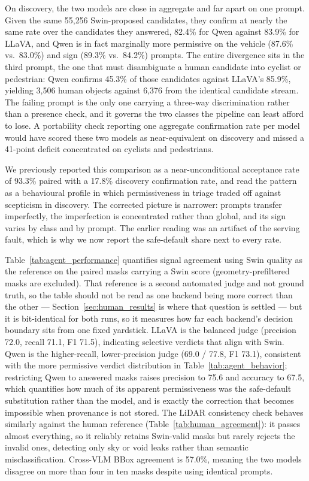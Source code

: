 \documentclass[conference]{IEEEtran}
\begin{document}
On discovery, the two models are close in aggregate and far apart on one prompt.
Given the same 55{,}256 Swin-proposed candidates, they confirm at nearly the same rate over the candidates they answered, 82.4\% for Qwen against 83.9\% for LLaVA, and Qwen is in fact marginally more permissive on the vehicle (87.6\% vs.\ 83.0\%) and sign (89.3\% vs.\ 84.2\%) prompts.
The entire divergence sits in the third prompt, the one that must disambiguate a human candidate into cyclist or pedestrian: Qwen confirms 45.3\% of those candidates against LLaVA's 85.9\%, yielding 3{,}506 human objects against 6{,}376 from the identical candidate stream.
The failing prompt is the only one carrying a three-way discrimination rather than a presence check, and it governs the two classes the pipeline can least afford to lose.
A portability check reporting one aggregate confirmation rate per model would have scored these two models as near-equivalent on discovery and missed a 41-point deficit concentrated on cyclists and pedestrians.

We previously reported this comparison as a near-unconditional acceptance rate of 93.3\% paired with a 17.8\% discovery confirmation rate, and read the pattern as a behavioural profile in which permissiveness in triage traded off against scepticism in discovery.
The corrected picture is narrower: prompts transfer imperfectly, the imperfection is concentrated rather than global, and its sign varies by class and by prompt.
The earlier reading was an artifact of the serving fault, which is why we now report the safe-default share next to every rate.



Table~\ref{tab:agent_performance} quantifies signal agreement using Swin quality as the reference on the paired masks carrying a Swin score (geometry-prefiltered masks are excluded).
That reference is a second automated judge and not ground truth, so the table should not be read as one backend being more correct than the other --- Section~\ref{sec:human_results} is where that question is settled --- but it is bit-identical for both runs, so it measures how far each backend's decision boundary sits from one fixed yardstick.
LLaVA is the balanced judge (precision 72.0, recall 71.1, F1 71.5), indicating selective verdicts that align with Swin.
Qwen is the higher-recall, lower-precision judge (69.0 / 77.8, F1 73.1), consistent with the more permissive verdict distribution in Table~\ref{tab:agent_behavior}; restricting Qwen to answered masks raises precision to 75.6 and accuracy to 67.5, which quantifies how much of its apparent permissiveness was the safe-default substitution rather than the model, and is exactly the correction that becomes impossible when provenance is not stored.
The LiDAR consistency check behaves similarly against the human reference (Table~\ref{tab:human_agreement}): it passes almost everything, so it reliably retains Swin-valid masks but rarely rejects the invalid ones, detecting only sky or void leaks rather than semantic misclassification.
Cross-VLM BBox agreement is 57.0\%, meaning the two models disagree on more than four in ten masks despite using identical prompts.
\end{document}
